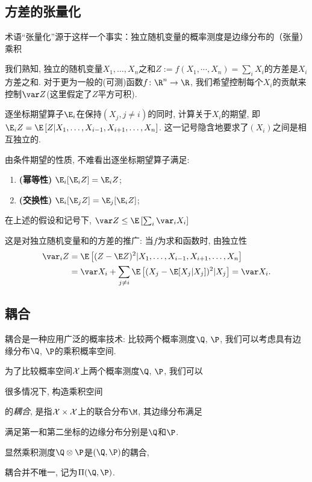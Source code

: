 \subsection{方差的张量化}

术语“张量化”源于这样一个事实：独立随机变量的概率测度是边缘分布的（张量）乘积

我们熟知, 独立的随机变量$X_1, \dots, X_n$之和$Z := f(X_1, \cdots, X_n) = \sum_i X_i$的方差是$X_i$方差之和. 
对于更为一般的(可测)函数$f \colon \R^n \to \R$, 我们希望控制每个$X_i$的贡献来控制$\var Z$(这里假定了$Z$平方可积). 

\begin{definition}[逐坐标期望]
	逐坐标期望算子$\E_i$在保持$(X_j, j \neq i)$的同时, 计算关于$X_i$的期望, 即$\E_i Z 
		= \E\left[ Z | X_1, \dots, X_{i-1}, X_{i+1}, \dots, X_n \right]$. 
	这一记号隐含地要求了$(X_i)$之间是相互独立的. 
\end{definition}

由条件期望的性质, 不难看出逐坐标期望算子满足:  
	\begin{enumerate}[label=(\roman*)]
		\item \textbf{(幂等性)} $\E_i[\E_i Z] = \E_i Z$; 
		\item \textbf{(交换性)} $\E_i[\E_j Z] = \E_j [\E_i Z]$; 
	\end{enumerate}

\begin{theorem}[方差的张量化]
	在上述的假设和记号下, $\var Z \leq \E \left[ \sum_i \var_i X_i \right]$
\end{theorem}

\begin{remark}
	这是对独立随机变量和的方差的推广: 当$f$为求和函数时, 由独立性
	\begin{align*}
		\var_i Z 
		&= \E \left[ (Z - \E Z)^2 | X_1, \dots, X_{i-1}, X_{i+1}, \dots, X_n \right] \\
		&= \var X_i + \sum_{j \neq i} \E \left[ (X_j - \E[X_j | X_j] )^2 | X_j \right]
		= \var X_i. 
	\end{align*}
\end{remark}



\subsection{耦合}

耦合是一种应用广泛的概率技术: 比较两个概率测度$\Q$, $\P$, 我们可以考虑具有边缘分布$\Q$, $\P$的乘积概率空间. 

为了比较概率空间$\mathcal{X}$上两个概率测度$\Q$, $\P$, 我们可以

很多情况下, 构造乘积空间

的\emph{耦合}, 是指$\mathcal{X} \times \mathcal{X}$上的联合分布$\M$, 其边缘分布满足

满足第一和第二坐标的边缘分布分别是$\Q$和$\P$.


显然乘积测度$\Q \otimes \P$是$(\Q, \P)$的耦合, 

耦合并不唯一, 记为$\Pi(\Q, \P)$. 
